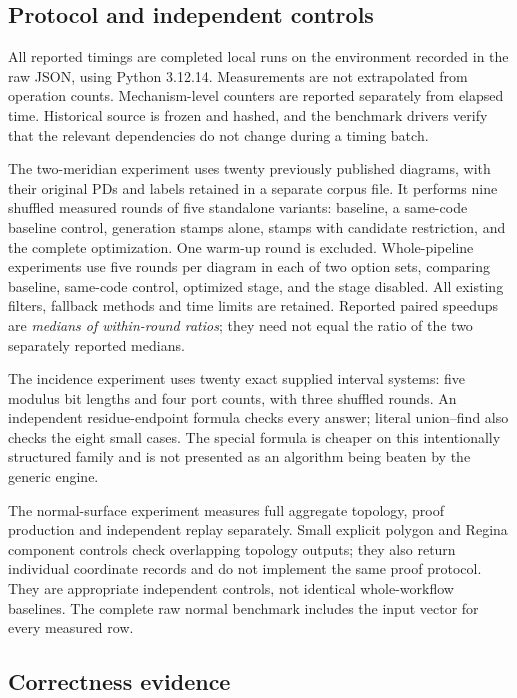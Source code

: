 \subsection{Protocol and independent controls}

All reported timings are completed local runs on the environment recorded
in the raw JSON, using Python 3.12.14. Measurements are not extrapolated
from operation counts. Mechanism-level counters are reported separately
from elapsed time. Historical source is frozen and hashed, and the
benchmark drivers verify that the relevant dependencies do not change
during a timing batch.

The two-meridian experiment uses twenty previously published diagrams,
with their original PDs and labels retained in a separate corpus file.
It performs nine shuffled measured rounds of five standalone variants:
baseline, a same-code baseline control, generation stamps alone, stamps
with candidate restriction, and the complete optimization. One warm-up
round is excluded. Whole-pipeline experiments use five rounds per diagram
in each of two option sets, comparing baseline, same-code control,
optimized stage, and the stage disabled. All existing filters, fallback
methods and time limits are retained. Reported paired speedups are
\emph{medians of within-round ratios}; they need not equal the ratio of
the two separately reported medians.

The incidence experiment uses twenty exact supplied interval systems:
five modulus bit lengths and four port counts, with three shuffled rounds.
An independent residue-endpoint formula checks every answer; literal
union--find also checks the eight small cases. The special formula is
cheaper on this intentionally structured family and is not presented as
an algorithm being beaten by the generic engine.

The normal-surface experiment measures full aggregate topology, proof
production and independent replay separately. Small explicit polygon
and Regina component controls check overlapping topology outputs; they
also return individual coordinate records and do not implement the same
proof protocol. They are appropriate independent controls, not identical
whole-workflow baselines. The complete raw normal benchmark includes
the input vector for every measured row.

\subsection{Correctness evidence}

